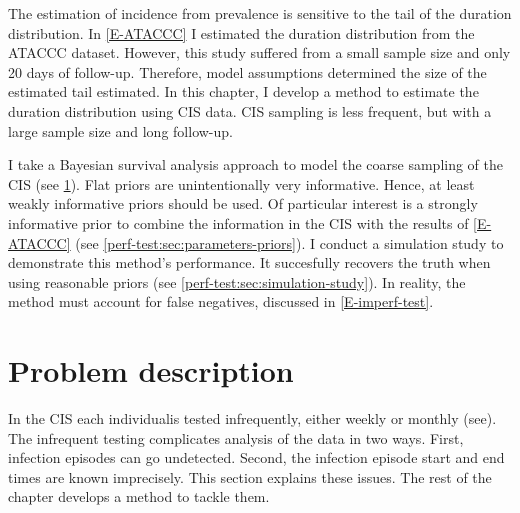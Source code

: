 \documentclass[thesis.tex]{subfiles}
\begin{document}
The estimation of incidence from prevalence is sensitive to the tail of the duration distribution.
In \cref{E-ATACCC} I estimated the duration distribution from the ATACCC dataset.
However, this study suffered from a small sample size and only 20 days of follow-up.
Therefore, model assumptions determined the size of the estimated tail estimated.
In this chapter, I develop a method to estimate the duration distribution using CIS data. CIS sampling is less frequent, but with a large sample size and long follow-up.

I take a Bayesian survival analysis approach to model the coarse sampling of the CIS (see \cref{perf-test:sec:problem}).
Flat priors are unintentionally very informative.
Hence, at least weakly informative priors should be used.
Of particular interest is a strongly informative prior to combine the information in the CIS with the results of \cref{E-ATACCC} (see \cref{perf-test:sec:parameters-priors}).
I conduct a simulation study to demonstrate this method's performance.
It succesfully recovers the truth when using reasonable priors (see \cref{perf-test:sec:simulation-study}).
In reality, the method must account for false negatives, discussed in \cref{E-imperf-test}.

\section{Problem description} \label{perf-test:sec:problem}

In the CIS each individualis tested  infrequently, either weekly or monthly (see).
The infrequent testing complicates analysis of the data in two ways.
First, infection episodes can go undetected.
Second, the infection episode start and end times are known imprecisely.
This section explains these issues. The rest of the chapter develops a method to tackle  them.
\end{document}
